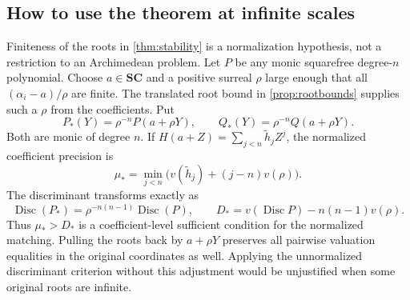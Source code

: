 \documentclass[11pt,letterpaper]{article}
\numberwithin{equation}{section}
\theoremstyle{definition}
\theoremstyle{remark}
\newcommand{\SC}{\mathbf{SC}}
\newcommand{\Disc}{\operatorname{Disc}}
\begin{document}
\subsection{How to use the theorem at infinite scales}\label{subsec:rescaledprecision}
Finiteness of the roots in \cref{thm:stability} is a normalization
hypothesis, not a restriction to an Archimedean problem. Let $P$ be any
monic squarefree degree-$n$ polynomial. Choose $a\in\SC$ and a positive
surreal $\rho$ large enough that all $(\alpha_i-a)/\rho$ are finite.
The translated root bound in \cref{prop:rootbounds} supplies such a $\rho$
from the coefficients. Put
\[
 P_*(Y)=\rho^{-n}P(a+\rho Y),\qquad
 Q_*(Y)=\rho^{-n}Q(a+\rho Y).
\]
Both are monic of degree $n$. If $H(a+Z)=\sum_{j<n}\widetilde h_jZ^j$,
the normalized coefficient precision is
\begin{equation}\label{eq:rescaledmu}
 \mu_* =\min_{j<n}\bigl(v(\widetilde h_j)+(j-n)v(\rho)\bigr).
\end{equation}
The discriminant transforms exactly as
\begin{equation}\label{eq:rescaleddisc}
 \Disc(P_*)=\rho^{-n(n-1)}\Disc(P),\qquad
 D_* =v(\Disc P)-n(n-1)v(\rho).
\end{equation}
Thus $\mu_*>D_*$ is a coefficient-level sufficient condition for the
normalized matching. Pulling the roots back by $a+\rho Y$ preserves all
pairwise valuation equalities in the original coordinates as well.
Applying the unnormalized discriminant criterion without this adjustment
would be unjustified when some original roots are infinite.
\end{document}
